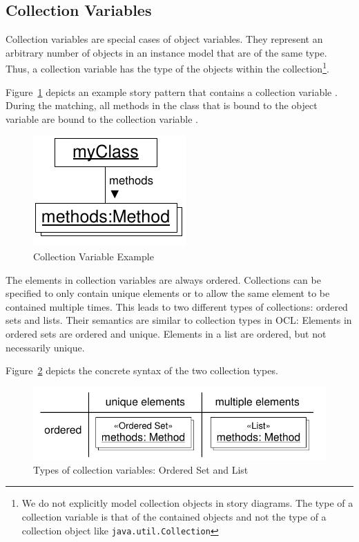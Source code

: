{
\subsection{Collection Variables}
\label{sec:StoryPatterns:collectionvariables}

Collection variables are special cases of object variables.
They represent an arbitrary number of objects in an instance model that are of the same type.
Thus, a collection variable has the type of the objects within the collection\footnote{We do not
explicitly model collection objects in story diagrams. The type of a collection variable is that of the contained objects and not the type of a collection object like 
\texttt{java.util.Collection}}.

Figure~\ref{fig:CollectionVariableExample} depicts an example story pattern that
contains a collection variable . During the matching, all
methods in the class that is bound to the object variable  are
bound to the collection variable .

\begin{figure}[htb]
  \centering
  \includegraphics[scale=0.9]{figures/CollectionVariableExample}
  \caption{Collection Variable Example}
  \label{fig:CollectionVariableExample}
\end{figure}

The elements in collection variables are always ordered.
Collections can be specified to only contain unique elements or to allow the same element to be contained multiple times.
This leads to two different types of collections: ordered sets and lists.
Their semantics are similar to collection types in OCL: Elements in
ordered sets are ordered and unique. Elements in a list are ordered, but not necessarily
unique.

Figure~\ref{fig:CollectionVariableTypes} depicts the concrete syntax of the two collection types.

\begin{figure}[htb]
  \centering
  \includegraphics[scale=0.8]{figures/CollectionVariables}
  \caption{Types of collection variables: Ordered Set and List}
  \label{fig:CollectionVariableTypes}
\end{figure}


}
